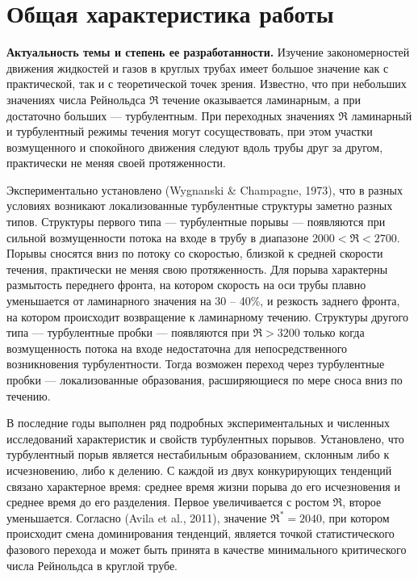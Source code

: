 \nocite{Vest18, MZG2017, MZG2015, Kazan2015, KMU2016, KMU2015, KMU2014} %
\nocite{Lomonosov2018, Lomonosov2017, Lomonosov2016, Lomonosov2015, Lomonosov2014, LomRead2017, LomRead2016, LomRead2014, NeZaTeGiUs2016, NeZaTeGiUs2014, Bur2016, Bur2014, Ob2018, ICMAR2016, Kazan2015conf}

\section*{\centering  Общая характеристика работы}

\textbf{Актуальность темы и степень ее разработанности.}
Изучение закономерностей движения жидкостей и газов в круглых трубах имеет большое значение как с практической, так и с теоретической точек зрения. Известно, что при небольших значениях числа Рейнольдса $\Re$ течение оказывается ламинарным, а при достаточно больших --- турбулентным. При переходных значениях $\Re$ ламинарный и турбулентный режимы течения могут сосуществовать, при этом участки возмущенного и спокойного движения следуют вдоль трубы друг за другом, практически не меняя своей протяженности. 

Экспериментально установлено (Wygnanski \& Champagne, 1973), что в разных условиях возникают локализованные турбулентные структуры заметно разных типов. Структуры первого типа --- турбулентные порывы --- появляются при сильной возмущенности потока на входе в трубу в диапазоне $2000<\Re<2700$. Порывы сносятся вниз по потоку со скоростью, близкой к средней скорости течения, практически не меняя свою протяженность. Для порыва характерны размытость переднего фронта, на котором скорость на оси трубы плавно уменьшается от ламинарного значения на 30 -- 40\%, и резкость заднего фронта, на котором происходит возвращение к ламинарному течению. Структуры другого типа --- турбулентные пробки --- появляются при $\Re>3200$ только когда возмущенность потока на входе недостаточна для непосредственного возникновения турбулентности. Тогда возможен переход через турбулентные пробки --- локализованные образования, расширяющиеся по мере сноса вниз по течению. 

В последние годы выполнен ряд подробных экспериментальных и численных исследований характеристик и свойств турбулентных порывов. Установлено, что турбулентный порыв является нестабильным образованием, склонным либо к исчезновению, либо к делению. С каждой из двух конкурирующих тенденций связано характерное время: среднее время жизни порыва до его исчезновения и среднее время до его разделения. Первое увеличивается с ростом $\Re$, второе уменьшается. Согласно (Avila et al., 2011), значение $\Re^*=2040$, при котором происходит смена доминирования тенденций, является точкой статистического фазового перехода и может быть принята в качестве минимального критического числа Рейнольдса в круглой трубе. 

